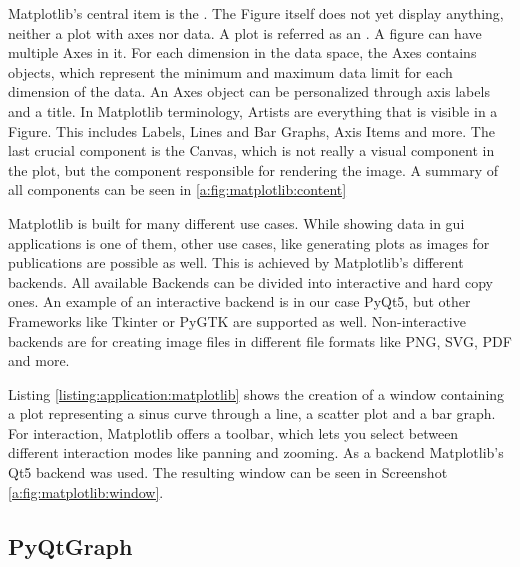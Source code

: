 Matplotlib's central item is the .
The Figure itself does not yet display anything, neither a plot with axes nor
data. A plot is referred as an . A
figure can have multiple Axes in it. For each dimension in the data space, the
Axes contains  objects, which
represent the minimum and maximum data limit for each dimension of the data. An
Axes object can be personalized through axis labels and a title. In Matplotlib
terminology, Artists are everything that is visible in a Figure. This includes
Labels, Lines and Bar Graphs, Axis Items and more. The last crucial component is
the Canvas, which is not really a visual component in the plot, but the
component responsible for rendering the image. A summary of all components can
be seen in \ref{a:fig:matplotlib:content}

Matplotlib is built for many different use cases. While showing data in
\gls{gui} applications is one of them, other use cases, like generating plots as
images for publications are possible as well. This is achieved by Matplotlib's
different backends. All available Backends can be divided into interactive and
hard copy ones. An example of an interactive backend is in our case PyQt5, but
other Frameworks like Tkinter or PyGTK are supported as well. Non-interactive
backends are for creating image files in different file formats like PNG, SVG,
PDF and more.
\cite{MatplotlibIntro, PythonDataVis}

Listing \ref{listing:application:matplotlib} shows the creation of a window
containing a plot representing a sinus curve through a line, a scatter plot and
a bar graph. For interaction, Matplotlib offers a toolbar, which lets you select
between different interaction modes like panning and zooming. As a backend
Matplotlib's Qt5 backend was used.  The resulting window can be seen in
Screenshot \ref{a:fig:matplotlib:window}.



\subsection{PyQtGraph} \label{sec:application:libraries:pyqtgraph}

